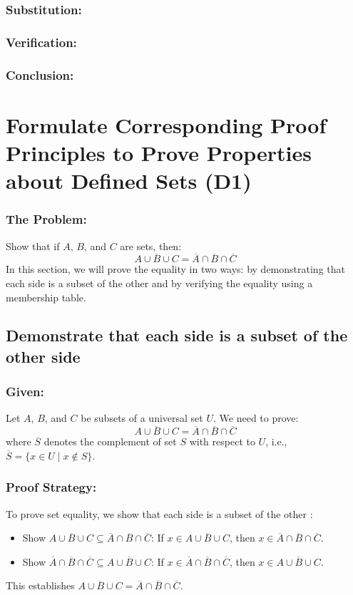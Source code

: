 \documentclass[12pt, a4paper, twoside]{report} %
\begin{document}
\subsubsection*{Substitution:}
\subsubsection*{Verification:}
\subsubsection*{Conclusion:}

\section{Formulate Corresponding Proof Principles to Prove Properties about Defined Sets (D1)}
\label{sec:D1}

\subsubsection*{The Problem:}
Show that if \( A \), \( B \), and \( C \) are sets, then:
\[
\overline{A \cup B \cup C} = \overline{A} \cap \overline{B} \cap \overline{C}
\]
In this section, we will prove the equality in two ways: by demonstrating that each side is a subset of the other and by verifying the equality using a membership table.

\subsection{Demonstrate that each side is a subset of the other side}

\subsubsection*{Given:}
Let \( A \), \( B \), and \( C \) be subsets of a universal set \( U \). We need to prove:
\[
\overline{A \cup B \cup C} = \overline{A} \cap \overline{B} \cap \overline{C}
\]
where \( \overline{S} \) denotes the complement of set \( S \) with respect to \( U \), i.e., \( \overline{S} = \{ x \in U \mid x \notin S \} \).

\subsubsection*{Proof Strategy:}
To prove set equality, we show that each side is a subset of the other \cite{epp2020}:
\begin{itemize}
  \item Show \( \overline{A \cup B \cup C} \subseteq \overline{A} \cap \overline{B} \cap \overline{C} \): If \( x \in \overline{A \cup B \cup C} \), then \( x \in \overline{A} \cap \overline{B} \cap \overline{C} \).
  \item Show \( \overline{A} \cap \overline{B} \cap \overline{C} \subseteq \overline{A \cup B \cup C} \): If \( x \in \overline{A} \cap \overline{B} \cap \overline{C} \), then \( x \in \overline{A \cup B \cup C} \).
\end{itemize}
This establishes \( \overline{A \cup B \cup C} = \overline{A} \cap \overline{B} \cap \overline{C} \).
\end{document}
